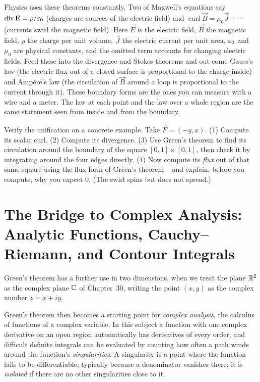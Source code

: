 \begin{connectionbox}
Physics uses these theorems constantly. Two of Maxwell's equations say
$\operatorname{div}\mathbf{E} = \rho/\varepsilon_0$ (charges are sources of the
electric field) and $\operatorname{curl}\vec B = \mu_0\vec J + \cdots$ (currents
swirl the magnetic field). Here $\vec E$ is the electric field, $\vec B$ the
magnetic field, $\rho$ the charge per unit volume, $\vec J$ the electric current
per unit area, $\varepsilon_0$ and $\mu_0$ are physical constants, and the omitted term
accounts for changing electric fields. Feed these into the divergence and Stokes
theorems and out come Gauss's law (the electric flux out of a closed surface is
proportional to the charge inside) and Amp\`ere's law (the circulation of $\vec B$
around a loop is proportional to the current through it). These boundary forms are
the ones you can measure with a wire and a meter. The law at each point and the law
over a whole region are the same statement seen from inside and from the boundary.
\end{connectionbox}

\begin{labbox}
Verify the unification on a concrete example. Take $\vec F=(-y,x)$.
(1) Compute its scalar curl. (2) Compute its divergence. (3) Use Green's theorem to
find its circulation around the boundary of the square $[0,1]\times[0,1]$, then
check it by integrating around the four edges directly. (4) Now compute its
\emph{flux} out of that same square using the flux form of Green's theorem -- and
explain, before you compute, why you expect $0$. (The swirl spins but does not
spread.)
\end{labbox}

\section{The Bridge to Complex Analysis: Analytic Functions, Cauchy--Riemann, and Contour Integrals}
\label{ch35:bridge-complex-analysis}

Green's theorem has a further use in two dimensions, when we treat the plane $\mathbb{R}^2$ as the complex plane $\mathbb{C}$ of Chapter~30, writing the point $(x,y)$ as the complex number $z = x + iy$.

Green's theorem then becomes a starting point for \emph{complex analysis}, the calculus of functions of a complex variable. In this subject a function with one complex derivative on an open region automatically has derivatives of every order, and difficult definite integrals can be evaluated by counting how often a path winds around the function's \emph{singularities}. A singularity is a point where the function fails to be differentiable, typically because a denominator vanishes there; it is \emph{isolated} if there are no other singularities close to it.

